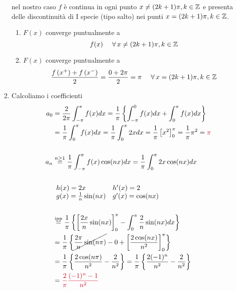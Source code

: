 \begin{enumerate}
nel nostro caso $f$ è continua in ogni punto $x\neq (2k + 1) \pi ,k\in \mathbb{Z} $ e presenta delle discontinuità di I specie (tipo salto) nei punti $x = (2k + 1) \pi ,k\in \mathbb{Z} $.
\begin{enumerate}
\item $F(x)$ converge puntualmente a
\begin{equation*}
f(x) \ \ \ \ \forall x\neq (2k + 1) \pi ,k\in \ZZ 
\end{equation*}
\item $F(x)$ converge puntualmente a
\begin{equation*}
\frac{f\left(x^{ + }\right) + f\left(x^{ - }\right)}{2} = \frac{0 + 2\pi }{2} = \pi \ \ \ \ \forall x = (2k + 1) \pi ,k\in \ZZ 
\end{equation*}
\end{enumerate}
\item Calcoliamo i coefficienti
\begin{align*}
a_{0} & = \frac{2}{2\pi }\int ^{\pi }_{ - \pi } f(x) dx = \frac{1}{\pi }\left\{\int ^{0}_{ - \pi } f(x) dx + \int ^{\pi }_{0} f(x) dx\right\}\\
 & = \frac{1}{\pi }\int ^{\pi }_{0} f(x) dx = \frac{1}{\pi }\int ^{\pi }_{0} 2xdx = \frac{1}{\pi }\left[ x^{2}\right]^{\pi }_{0} = \frac{1}{\pi } \pi ^{2} = \textcolor[rgb]{0.82,0.01,0.11}{\pi }\\
 & \\
a_{n} & \overset{n\geq 1}{ = }\frac{1}{\pi }\int ^{\pi }_{ - \pi } f(x)\cos(nx) dx = \frac{1}{\pi }\int ^{\pi }_{0} 2x\cos(nx) dx\\
 & \\
 & 
 \begin{array}{ l l }
h(x) = 2x & h'(x) = 2\\
g(x) = \frac{1}{n}\sin(nx) & g'(x) = \cos(nx)
\end{array}\\
 & \\
 & \overset{\text{ipp}}{ = }\frac{1}{\pi }\left\{\left[\frac{2x}{n}\sin(nx)\right]^{\pi }_{0} - \int ^{\pi }_{0}\frac{2}{n}\sin(nx) dx\right\}\\
 & = \frac{1}{\pi }\left\{\cancel{\frac{2\pi }{n}\sin(n\pi)} - 0 + \left[\frac{2\cos(nx)}{n^{2}}\right]^{\pi }_{0}\right\}\\
 & = \frac{1}{\pi }\left\{\frac{2\cos(n\pi)}{n^{2}} - \frac{2}{n^{2}}\right\} = \frac{1}{\pi }\left\{\frac{2(- 1)^{n}}{n^{2}} - \frac{2}{n^{2}}\right\}\\
 & = \textcolor[rgb]{0.82,0.01,0.11}{\frac{2}{\pi }}\textcolor[rgb]{0.82,0.01,0.11}{\frac{(- 1)^{n} - 1}{n^{2}}}\\

\end{align*}
\end{enumerate}
